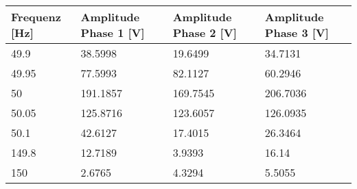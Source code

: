\begin{table}[ht!]
	\centering
	\begin{tabular}{|l|l|l|l|}
		\hline
		Frequenz {[}Hz{]} & Amplitude Phase 1 {[}V{]}                                                           & Amplitude Phase 2 {[}V{]}                                                           & Amplitude Phase 3 {[}V{]}                                                           \\ \hline
		49.9              & 38.5998                                                                             & 19.6499                                                                             & 34.7131                                                                             \\ \hline
		49.95             & 77.5993                                                                             & 82.1127                                                                             & 60.2946                                                                             \\ \hline
		50                & 191.1857                                                                            & 169.7545                                                                            & 206.7036                                                                            \\ \hline
		50.05             & 125.8716                                                                            & 123.6057                                                                            & 126.0935                                                                            \\ \hline
		50.1              & 42.6127                                                                             & 17.4015                                                                             & 26.3464                                                                             \\ \hline
		149.8             & 12.7189                                                                             & 3.9393                                                                              & 16.14                                                                               \\ \hline
		150               & 2.6765                                                                              & 4.3294                                                                              & 5.5055                                                                              \\ \hline

\end{tabular}
\end{table}
